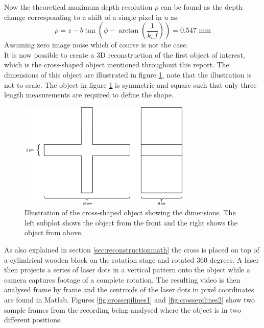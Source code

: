 Now the theoretical maximum depth resolution $\rho$ can be found as the depth change corresponding to a shift of a single pixel in $u$ as:
\begin{equation}
    \rho = z - b \tan{\left( \phi - \arctan{\left( \frac{1}{k_{u} f} \right)} \right)} = 0.547 \text{ mm}
\end{equation}
Assuming zero image noise which of course is not the case.\\ 

It is now possible to create a 3D reconstruction of the first object of interest, which is the cross-shaped object mentioned throughout this report. The dimensions of this object are illustrated in figure \ref{fig:crossdimensions}, note that the illustration is not to scale. The object in figure \ref{fig:crossdimensions} is symmetric and square such that only three length measurements are required to define the shape. 
 
\begin{figure}[h]
    \centering
    \includegraphics[width=0.73\textwidth]{figures/reconstruction/crossdimensions.pdf}
    \caption{Illustration of the cross-shaped object showing the dimensions. The left subplot shows the object from the front and the right shows the object from above.}
    \label{fig:crossdimensions}
\end{figure}

As also explained in section \ref{sec:reconstructionmath} the cross is placed on top of a cylindrical wooden block on the rotation stage and rotated 360 degrees. A laser then projects a series of laser dots in a vertical pattern onto the object while a camera captures footage of a complete rotation. The resulting video is then analysed frame by frame and the centroids of the laser dots in pixel coordinates are found in Matlab. Figures \ref{fig:crossepilines1} and \ref{fig:crossepilines2} show two sample frames from the recording being analysed where the object is in two different positions.\\

